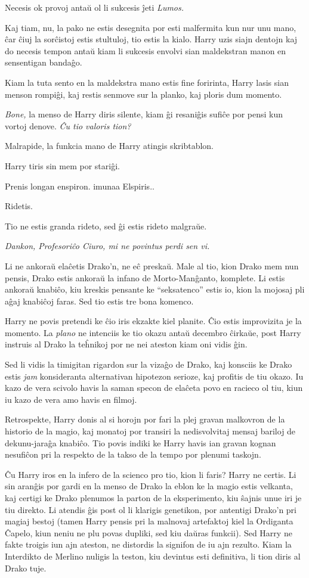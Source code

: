 Necesis ok provoj antaŭ ol li sukcesis ĵeti \emph{Lumos.}

Kaj tiam, nu, la pako ne estis desegnita por esti malfermita kun nur
unu mano, ĉar ĉiuj la sorĉistoj estis stultuloj, tio estis la
kialo. Harry uzis siajn dentojn kaj do necesis tempon antaŭ kiam li
sukcesis envolvi sian maldekstran manon en sensentigan bandaĝo.

Kiam la tuta sento en la maldekstra mano estis fine foririnta, Harry
lasis sian menson rompiĝi, kaj restis senmove sur la planko, kaj
ploris dum momento.

\emph{Bone,} la menso de Harry diris silente, kiam ĝi resaniĝis sufiĉe
por pensi kun vortoj denove. \emph{Ĉu tio valoris tion?}

Malrapide, la funkcia mano de Harry atingis skribtablon.

Harry tiris sin mem por stariĝi.

Prenis longan enspiron.
imunaa 
Elspiris..

Ridetis.

Tio ne estis granda rideto, sed ĝi estis rideto malgraŭe.

\emph{Dankon, Profesoriĉo Ciuro, mi ne povintus perdi sen vi.}

Li ne ankoraŭ elaĉetis Drako'n, ne eĉ preskaŭ. Male al tio, kion
Drako mem nun pensis, Drako estis ankoraŭ la infano de Morto-Manĝanto,
komplete. Li estis ankoraŭ knabiĉo, kiu kreskis pensante ke
``seksatenco'' estis io, kion la mojosaj pli aĝaj knabiĉoj faras. Sed
tio estis tre bona komenco.

Harry ne povis pretendi ke ĉio iris ekzakte kiel planite. Ĉio estis
improvizita je la momento. La \emph{plano} ne intenciis ke tio okazu
antaŭ decembro ĉirkaŭe, post Harry instruis al Drako la teĥnikoj por
ne nei ateston kiam oni vidis ĝin.

Sed li vidis la timigitan rigardon sur la vizaĝo de Drako, kaj
konsciis ke Drako estis \emph{jam} konsideranta alternativan hipotezon
serioze, kaj profitis de tiu okazo. Iu kazo de vera scivolo havis la
saman specon de elaĉeta povo en racieco ol tiu, kiun iu kazo de vera
amo havis en filmoj.

Retrospekte, Harry donis al si horojn por fari la plej gravan
malkovron de la historio de la magio, kaj monatoj por transiri la
nedisvolvitaj mensaj bariloj de dekunu-jaraĝa knabiĉo. Tio povis
indiki ke Harry havis ian gravan kognan nesufiĉon pri la respekto de
la takso de la tempo por plenumi taskojn.

Ĉu Harry iros en la infero de la scienco pro tio, kion li faris? Harry
ne certis. Li sin aranĝis por gardi en la menso de Drako la eblon ke
la magio estis velkanta, kaj certigi ke Drako plenumos la parton de la
eksperimento, kiu ŝajnis unue iri je tiu direkto. Li atendis ĝis post
ol li klarigis genetikon, por antentigi Drako'n pri magiaj bestoj
(tamen Harry pensis pri la malnovaj artefaktoj kiel la Ordiganta
Ĉapelo, kiun neniu ne plu povas dupliki, sed kiu daŭras funkcii). Sed
Harry ne fakte troigis iun ajn ateston, ne distordis la signifon de iu
ajn rezulto. Kiam la Interdikto de Merlino nuligis la teston, kiu
devintus esti definitiva, li tion diris al Drako tuje.

